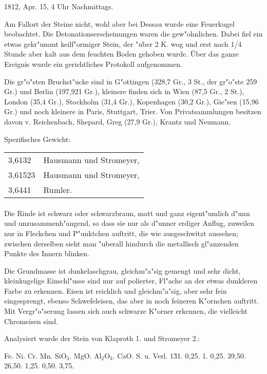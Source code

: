 \documentclass[a4paper, 11pt, oneside]{article}
\begin{document}
1812, Apr. 15, 4 Uhr Nachmittags.

Am Fallort der Steine nicht, wohl aber bei Dessau wurde eine Feuerkugel beobachtet. Die Detonationserscheinungen waren die gew"ohnlichen. Dabei fiel ein etwas gekr"ummt keilf"ormiger Stein, der "uber 2 K. wog und erst nach 1/4 Stunde aber kalt aus dem feuchten Boden gehoben wurde. Über das ganze Ereignis wurde ein gerichtliches Protokoll aufgenommen.

Die gr"o"sten Bruchst"ucke sind in G"ottingen (328,7 Gr., 3 St., der gr"o"ste 259 Gr.) und Berlin (197,921 Gr.), kleinere finden sich in Wien (87,5 Gr., 2 St.), London (35,4 Gr.), Stockholm (31,4 Gr.), Kopenhagen (30,2 Gr.), Gie"sen (15,96 Gr.) und noch kleinere in Paris, Stuttgart, Trier. Von Privatsammlungen besitzen davon v. Reichenbach, Shepard, Greg (27,9 Gr.), Krantz und Neumann.

Spezifisches Gewicht:
\begin{table}[!ht]
    \centering
    \begin{tabular}{l l}
        3,6132 & Hausmann und Stromeyer,\\
        3,61523 & Hausmann und Stromeyer,\\
        3,6441 & Rumler.
    \end{tabular}
\end{table}
\paragraph{}
Die Rinde ist schwarz oder schwarzbraun, matt und ganz eigent"umlich d"unn und unzusammenh"angend, so dass sie nur als d"unner erdiger Anflug, zuweilen nur in Fleckchen und P"unktchen auftritt, die wie ausgeschwitzt aussehen; zwischen derselben sieht man "uberall hindurch die metallisch gl"anzenden Punkte des Innern blinken.

Die Grundmasse ist dunkelaschgrau, gleichm"a"sig gemengt und sehr dicht, kleinkugelige Einschl"usse sind nur auf polierter, Fl"ache an der etwas dunkleren Farbe zu erkennen. Eisen ist reichlich und gleichm"a"sig, aber sehr fein eingesprengt, ebenso Schwefeleisen, das aber in noch feineren K"ornchen auftritt. Mit Vergr"o"serung lassen sich auch schwarze K"orner erkennen, die vielleicht Chromeisen sind.

Analysiert wurde der Stein von Klaproth 1. und Stromeyer 2.:

Fe. Ni. Cr. Mn. SiO$_{3}$. MgO. Al$_{2}$O$_{3}$. CaO. S. u. Verl.  
1\. 31. 0,25. 1. 0,25. 39,50. 26,50. 1,25. 0,50. 3,75.
\end{document}
